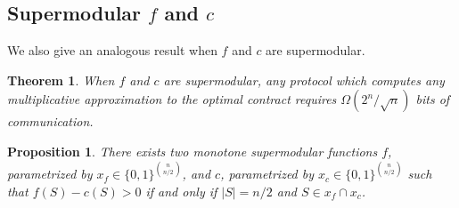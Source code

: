 \documentclass[11pt]{article}
\newtheorem{theorem}{Theorem}
\newtheorem{proposition}{Proposition}
\begin{document}
\subsection{Supermodular $f$ and $c$}
We also give an analogous result when $f$ and $c$ are supermodular.

\begin{theorem}\label{thm:cc_inapprox_sup_sup}
    When $f$ and $c$ are supermodular, any protocol which computes any multiplicative approximation to the optimal contract requires $\Omega(2^n/\sqrt{n})$ bits of communication.
\end{theorem}

\begin{proposition}
    There exists two monotone supermodular functions $f$, parametrized by $x_f \in \{0,1\}^{\binom{n}{n/2}}$, and $c$, parametrized by $x_c \in \{0,1\}^{\binom{n}{n/2}}$ such that  $f(S) - c(S) > 0$ if and only if $|S|=n/2$ and $S \in x_f \cap x_c$.
\end{proposition}
\end{document}
